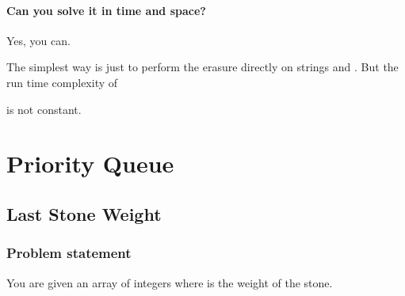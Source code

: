 \documentclass[letterpaper,12pt,english]{book}
\begin{document}
\subsubsection{Can you solve it in  time and  space?}
\label{\detokenize{Stack/844_Backspace_String_Compare:can-you-solve-it-in-o-n-time-and-o-1-space}}
\sphinxAtStartPar
Yes, you can.

\sphinxAtStartPar
The simplest way is just to perform the erasure directly on strings  and . But the run time complexity of %
\begin{footnote}[55]\sphinxAtStartFootnote
{}
%
\end{footnote}  is not constant.

\sphinxstepscope


\chapter{Priority Queue}
\label{\detokenize{Priority_Queue/index:priority-queue}}\label{\detokenize{Priority_Queue/index::doc}}
\sphinxstepscope


\section{Last Stone Weight}
\label{\detokenize{Priority_Queue/1046_Last_Stone_Weight:last-stone-weight}}\label{\detokenize{Priority_Queue/1046_Last_Stone_Weight::doc}}

\subsection{Problem statement\sphinxfootnotemark[56]}
\label{\detokenize{Priority_Queue/1046_Last_Stone_Weight:problem-statement}}%
\begin{footnotetext}[56]\sphinxAtStartFootnote
{}
%
\end{footnotetext}\ignorespaces 
\sphinxAtStartPar
You are given an array of integers  where  is the weight of the  stone.
\end{document}
